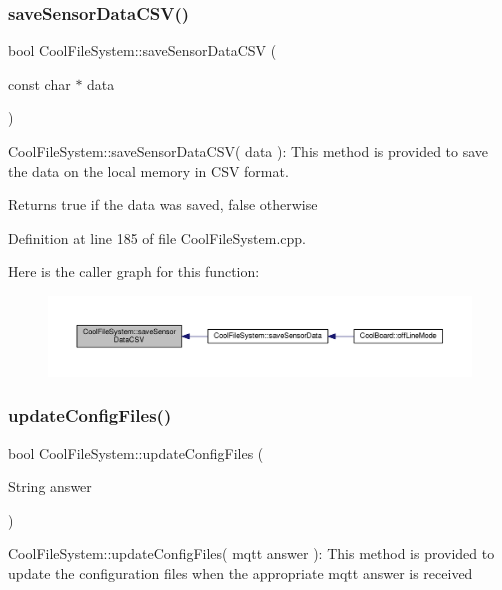 \subsubsection{\texorpdfstring{save\+Sensor\+Data\+C\+S\+V()}{saveSensorDataCSV()}}
{\footnotesize\ttfamily bool Cool\+File\+System\+::save\+Sensor\+Data\+C\+SV (\begin{DoxyParamCaption}\item[{const char $\ast$}]{data }\end{DoxyParamCaption})}

Cool\+File\+System\+::save\+Sensor\+Data\+C\+S\+V( data )\+: This method is provided to save the data on the local memory in C\+SV format.

\begin{DoxyReturn}{Returns}
true if the data was saved, false otherwise 
\end{DoxyReturn}


Definition at line 185 of file Cool\+File\+System.\+cpp.

Here is the caller graph for this function\+:\nopagebreak
\begin{figure}[H]
\begin{center}
\leavevmode
\includegraphics[width=350pt]{class_cool_file_system_ab78704d5d21ce10fc6f1138ab5ab46c8_icgraph}
\end{center}
\end{figure}
\mbox{\label{class_cool_file_system_adfa8e2e80641ae6f0cceabd348a9b841}} 
\subsubsection{\texorpdfstring{update\+Config\+Files()}{updateConfigFiles()}}
{\footnotesize\ttfamily bool Cool\+File\+System\+::update\+Config\+Files (\begin{DoxyParamCaption}\item[{String}]{answer }\end{DoxyParamCaption})}

Cool\+File\+System\+::update\+Config\+Files( mqtt answer )\+: This method is provided to update the configuration files when the appropriate mqtt answer is received

